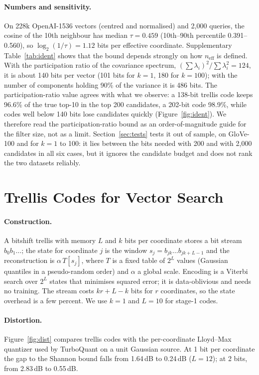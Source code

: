 \documentclass[fleqn,10pt]{wlscirep}
\begin{document}
\paragraph{Numbers and sensitivity.} On 228k OpenAI-1536 vectors (centred and normalised) and 2{,}000 queries, the cosine of the 10th neighbour has median $\tau=0.459$ (10th--90th percentile 0.391--0.560), so $\log_2(1/\tau)=1.12$ bits per effective coordinate. Supplementary Table~\ref{tab:ident} shows that the bound depends strongly on how $n_{\mathrm{eff}}$ is defined. With the participation ratio of the covariance spectrum, $(\sum\lambda_i)^2/\sum\lambda_i^2=124$, it is about 140 bits per vector (101 bits for $k=1$, 180 for $k=100$); with the number of components holding 90\% of the variance it is 486 bits. The participation-ratio value agrees with what we observe: a 138-bit trellis code keeps 96.6\% of the true top-10 in the top 200 candidates, a 202-bit code 98.9\%, while codes well below 140 bits lose candidates quickly (Figure~\ref{fig:ident}). We therefore read the participation-ratio bound as an order-of-magnitude guide for the filter size, not as a limit. Section~\ref{sec:tests} tests it out of sample, on GloVe-100 and for $k=1$ to 100: it lies between the bits needed with 200 and with 2{,}000 candidates in all six cases, but it ignores the candidate budget and does not rank the two datasets reliably.

\section{Trellis Codes for Vector Search}\label{sec:trellis}
\paragraph{Construction.} A bitshift trellis with memory $L$ and $k$ bits per coordinate stores a bit stream $b_0b_1\dots$; the state for coordinate $j$ is the window $s_j=b_{jk}\dots b_{jk+L-1}$ and the reconstruction is $\alpha\,T[s_j]$, where $T$ is a fixed table of $2^L$ values (Gaussian quantiles in a pseudo-random order) and $\alpha$ a global scale. Encoding is a Viterbi search over $2^L$ states that minimises squared error; it is data-oblivious and needs no training. The stream costs $kr+L-k$ bits for $r$ coordinates, so the state overhead is a few percent. We use $k=1$ and $L=10$ for stage-1 codes.

\paragraph{Distortion.} Figure~\ref{fig:dist} compares trellis codes with the per-coordinate Lloyd--Max quantizer used by TurboQuant on a unit Gaussian source. At 1 bit per coordinate the gap to the Shannon bound falls from 1.64\,dB to 0.24\,dB ($L=12$); at 2 bits, from 2.83\,dB to 0.55\,dB.
\end{document}
